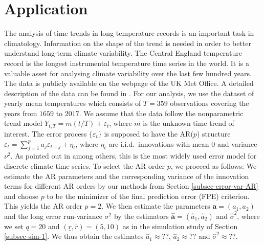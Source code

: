 \begin{enumerate}[label=(\roman*),leftmargin=0.9cm]

\end{enumerate}



\section{Application}\label{sec-data}


The analysis of time trends in long temperature records is an important task in climatology. Information on the shape of the trend is needed in order to better understand long-term climate variability. The Central England temperature record is the longest instrumental temperature time series in the world. It is a valuable asset for analysing climate variability over the last few hundred years. The data is publicly available on the webpage of the UK Met Office. A detailed description of the data can be found in \cite{Parker1992}. For our analysis, we use the dataset of yearly mean temperatures which consists of $T=359$ observations covering the years from $1659$ to $2017$. We assume that the data follow the nonparametric trend model $Y_{t,T} = m(t/T) + \varepsilon_t$, where $m$ is the unknown time trend of interest. The error process $\{ \varepsilon_t \}$ is supposed to have the AR($p$) structure $\varepsilon_t = \sum_{j=1}^p a_j \varepsilon_{t-j} + \eta_t$, where $\eta_t$ are i.i.d.\ innovations with mean $0$ and variance $\nu^2$. As pointed out in \cite{Mudelsee2010} among others, this is the most widely used error model for discrete climate time series. To select the AR order $p$, we proceed as follows: We estimate the AR parameters and the corresponding variance of the innovation terms for different AR orders by our methods from Section \ref{subsec-error-var-AR} and choose $p$ to be the minimizer of the final prediction error (FPE) criterion. This yields the AR order $p = 2$. We then estimate the parameters $\boldsymbol{a} = (a_1,a_2)$ and the long error run-variance $\sigma^2$ by the estimators $\widehat{\boldsymbol{a}} = (\widehat{a}_1,\widehat{a}_2)$ and $\widehat{\sigma}^2$, where we set $q = 20$ and $(\underline{r},\overline{r}) = (5,10)$ as in the simulation study of Section \ref{subsec-sim-1}. We thus obtain the estimates $\widehat{a}_1 \approx ??$, $\widehat{a}_2 \approx ??$ and $\widehat{\sigma}^2 \approx ??$.


